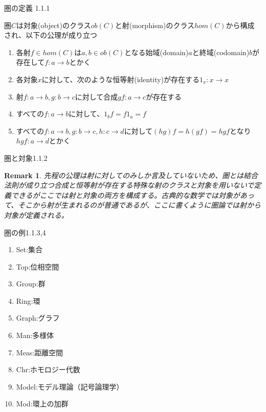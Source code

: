 \documentclass[unicode,12pt,aspectratio=169]{beamer}
\newtheorem*{remark}{Remark}
\begin{document}
\begin{frame}{圏の定義 1.1.1}
    \begin{tcolorbox}
        \begin{definition}
            圏$C$は対象(object)のクラス$ob(C)$と射(morphism)のクラス$hom(C)$から構成され、以下の公理が成り立つ
            \begin{enumerate}
                \item 各射$f\in hom(C)$は$a,b\in ob(C)$となる始域(domain)$a$と終域(codomain)$b$が存在して$f:a \rightarrow b$とかく
                \item 各対象$x$に対して、次のような恒等射(identity)が存在する$1_x:x \rightarrow x$
                \item 射$f: a \rightarrow b,g: b \rightarrow c$に対して合成$gf: a \rightarrow c$が存在する
                \item すべての$f:a \rightarrow b$に対して、$1_bf = f1_a = f$
                \item すべての$f:a \rightarrow b,g:b \rightarrow c,h:c \rightarrow d$に対して$(hg)f = h(gf) = hgf$となり$hgf: a\rightarrow d$とかく
            \end{enumerate}
        \end{definition}
    \end{tcolorbox}
\end{frame}
\begin{frame}{圏と対象1.1.2}
    \begin{tcolorbox}
        \begin{remark}
            先程の公理は射に対してのみしか言及していないため、圏とは結合法則が成り立つ合成と恒等射が存在する特殊な射のクラスと対象を用いないで定義できるがここでは射と対象の両方を構成する。古典的な数学では対象があって、そこから射が生まれるのが普通であるが、ここに書くように圏論では射から対象が定義される。
        \end{remark}
    \end{tcolorbox}
\end{frame}
\begin{frame}{圏の例1.1.3,4}
    \begin{tcolorbox}
        \begin{example}
            \begin{enumerate}
                \item Set:集合
                \item Top:位相空間
                \item Group:群
                \item Ring:環
                \item Graph:グラフ
                \item Man:多様体
                \item Meas:距離空間
                \item Chr:ホモロジー代数
                \item Model:モデル理論（記号論理学）
                \item Mod:環上の加群
            \end{enumerate}
        \end{example}
    \end{tcolorbox}
\end{frame}
\end{document}
